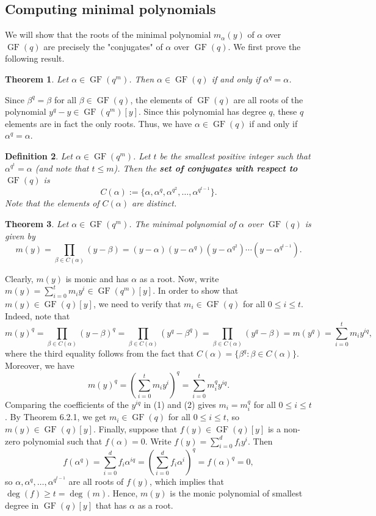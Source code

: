 \documentclass[10pt]{article}
\makeatletter
\DeclareMathOperator{\GF}{GF}
\theoremstyle{newstyle}
\newtheorem{thm}{Theorem}[subsection]
\newtheorem{defn}[thm]{Definition}
\newenvironment{pf}[1][\proofname]{\par
  \pushQED{\qed}%
  \normalfont \topsep0\p@\relax
  \trivlist
  \item[\hskip\labelsep\scshape
  #1\@addpunct{.}]\ignorespaces
}{%
  \popQED\endtrivlist\@endpefalse
}
\makeatother
\begin{document}
\subsection{Computing minimal polynomials}

We will show that the roots of the minimal polynomial $m_\alpha(y)$ of 
$\alpha$ over $\GF(q)$ are precisely the "conjugates" of $\alpha$ over $\GF(q)$. 
We first prove the following result. 

\begin{thm}
Let $\alpha \in \GF(q^m)$. Then $\alpha \in \GF(q)$ if and only if $\alpha^q = \alpha$.
\end{thm}
\begin{pf}
Since $\beta^q = \beta$ for all $\beta \in \GF(q)$, the elements of $\GF(q)$ are 
all roots of the polynomial $y^q - y \in \GF(q^m)[y]$. Since this polynomial 
has degree $q$, these $q$ elements are in fact the only roots. Thus, we have 
$\alpha \in \GF(q)$ if and only if $\alpha^q = \alpha$. 
\end{pf}

\begin{defn}
Let $\alpha \in \GF(q^m)$. Let $t$ be the smallest positive integer such that $\alpha^{q^t} = 
\alpha$ (and note that $t \leq m$). Then the {\bf set of conjugates with respect to 
$\GF(q)$} is 
\[ C(\alpha) := \{\alpha, \alpha^q, \alpha^{q^2}, \dots, \alpha^{q^{t-1}}\}. \]
Note that the elements of $C(\alpha)$ are distinct. 
\end{defn}

\begin{thm}
Let $\alpha \in \GF(q^m)$. The minimal polynomial of $\alpha$ over $\GF(q)$ is given by 
\[ m(y) = \prod_{\beta \in C(\alpha)} (y - \beta) = (y-\alpha)(y-\alpha^q)(y - \alpha^{q^2})
\cdots (y-\alpha^{q^{t-1}}). \]
\end{thm}
\begin{pf}
Clearly, $m(y)$ is monic and has $\alpha$ as a root. Now, write 
$m(y) = \sum_{i=0}^t m_i y^i \in \GF(q^m)[y]$. In order to show that $m(y) \in \GF(q)[y]$, 
we need to verify that $m_i \in \GF(q)$ for all $0 \leq i \leq t$. Indeed, note that 
\[ m(y)^q = \prod_{\beta \in C(\alpha)} (y-\beta)^q = \prod_{\beta \in C(\alpha)} 
(y^q - \beta^q) = \prod_{\beta \in C(\alpha)} (y^q - \beta) 
= m(y^q) = \sum_{i=0}^t m_i y^{iq}, \tag{1} \]
where the third equality follows from the fact that $C(\alpha) = \{\beta^q : \beta \in C(\alpha)\}$. 
Moreover, we have 
\[ m(y)^q = \left( \sum_{i=0}^t m_i y^i \right)^q = \sum_{i=0}^t m_i^q y^{iq}. \tag{2} \]
Comparing the coefficients of the $y^{iq}$ in (1) and (2) gives $m_i = m_i^q$ for all 
$0 \leq i \leq t$. By Theorem 6.2.1, we get $m_i \in \GF(q)$ for all $0 \leq i \leq t$, so 
$m(y) \in \GF(q)[y]$. Finally, suppose that $f(y) \in \GF(q)[y]$ is a non-zero polynomial 
such that $f(\alpha) = 0$. Write $f(y) = \sum_{i=0}^d f_i y^i$. Then 
\[ f(\alpha^q) = \sum_{i=0}^d f_i \alpha^{iq} = \left( \sum_{i=0}^d f_i \alpha^i \right)^q 
= f(\alpha)^q = 0, \]
so $\alpha, \alpha^q, \dots, \alpha^{q^{t-1}}$ are all roots of $f(y)$, which implies that 
$\deg(f) \geq t = \deg(m)$. Hence, $m(y)$ is the monic polynomial of smallest degree 
in $\GF(q)[y]$ that has $\alpha$ as a root. 
\end{pf}
\end{document}
